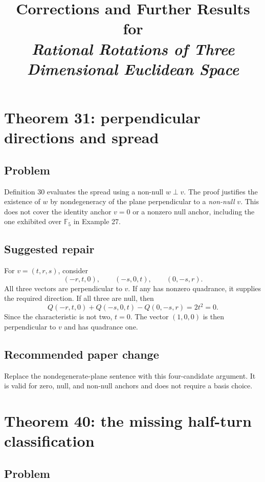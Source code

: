\documentclass[11pt]{article}
\title{Corrections and Further Results for\\
  \emph{Rational Rotations of Three Dimensional Euclidean Space}}
\newcommand{\F}{\mathbb F}
\begin{document}
\maketitle

\section{Theorem 31: perpendicular directions and spread}

\subsection{Problem}

Definition 30 evaluates the spread using a non-null \(w\perp v\).  The proof
justifies the existence of \(w\) by nondegeneracy of the plane perpendicular
to a \emph{non-null} \(v\).  This does not cover the identity anchor \(v=0\)
or a nonzero null anchor, including the one exhibited over \(\F_5\) in
Example 27.

\subsection{Suggested repair}

For \(v=(t,r,s)\), consider
\[
 (-r,t,0),\qquad(-s,0,t),\qquad(0,-s,r).
\]
All three vectors are perpendicular to \(v\).  If any has nonzero quadrance,
it supplies the required direction.  If all three are null, then
\[
 Q(-r,t,0)+Q(-s,0,t)-Q(0,-s,r)=2t^2=0.
\]
Since the characteristic is not two, \(t=0\).  The vector \((1,0,0)\) is
then perpendicular to \(v\) and has quadrance one.

\subsection{Recommended paper change}

Replace the nondegenerate-plane sentence with this four-candidate argument.
It is valid for zero, null, and non-null anchors and does not require a basis
choice.

\section{Theorem 40: the missing half-turn classification}

\subsection{Problem}
\end{document}
